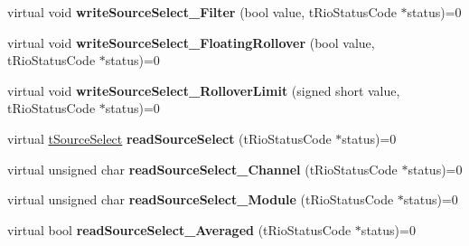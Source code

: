 \begin{DoxyCompactItemize}
\item 
\hypertarget{classnFPGA_1_1nFRC__2012__1__6__4_1_1tAnalogTrigger_a183d32683378e6e434ad2df7b1ef86e3}{
virtual void {\bfseries writeSourceSelect\_\-Filter} (bool value, tRioStatusCode $\ast$status)=0}
\label{classnFPGA_1_1nFRC__2012__1__6__4_1_1tAnalogTrigger_a183d32683378e6e434ad2df7b1ef86e3}

\item 
\hypertarget{classnFPGA_1_1nFRC__2012__1__6__4_1_1tAnalogTrigger_aaf884d77038a01ca2124cbf866f3843f}{
virtual void {\bfseries writeSourceSelect\_\-FloatingRollover} (bool value, tRioStatusCode $\ast$status)=0}
\label{classnFPGA_1_1nFRC__2012__1__6__4_1_1tAnalogTrigger_aaf884d77038a01ca2124cbf866f3843f}

\item 
\hypertarget{classnFPGA_1_1nFRC__2012__1__6__4_1_1tAnalogTrigger_aa5ac1f0ff0b1ccab9e44bfe392ce3aeb}{
virtual void {\bfseries writeSourceSelect\_\-RolloverLimit} (signed short value, tRioStatusCode $\ast$status)=0}
\label{classnFPGA_1_1nFRC__2012__1__6__4_1_1tAnalogTrigger_aa5ac1f0ff0b1ccab9e44bfe392ce3aeb}

\item 
\hypertarget{classnFPGA_1_1nFRC__2012__1__6__4_1_1tAnalogTrigger_a4989f92f70def5e6d3eda7fdbc5ac47e}{
virtual \hyperlink{unionnFPGA_1_1nFRC__2012__1__6__4_1_1tAnalogTrigger_1_1tSourceSelect}{tSourceSelect} {\bfseries readSourceSelect} (tRioStatusCode $\ast$status)=0}
\label{classnFPGA_1_1nFRC__2012__1__6__4_1_1tAnalogTrigger_a4989f92f70def5e6d3eda7fdbc5ac47e}

\item 
\hypertarget{classnFPGA_1_1nFRC__2012__1__6__4_1_1tAnalogTrigger_ae149d88f231c04cf32ae5e245637209f}{
virtual unsigned char {\bfseries readSourceSelect\_\-Channel} (tRioStatusCode $\ast$status)=0}
\label{classnFPGA_1_1nFRC__2012__1__6__4_1_1tAnalogTrigger_ae149d88f231c04cf32ae5e245637209f}

\item 
\hypertarget{classnFPGA_1_1nFRC__2012__1__6__4_1_1tAnalogTrigger_a3bd8de6cdcd78a46f9f22039baee218b}{
virtual unsigned char {\bfseries readSourceSelect\_\-Module} (tRioStatusCode $\ast$status)=0}
\label{classnFPGA_1_1nFRC__2012__1__6__4_1_1tAnalogTrigger_a3bd8de6cdcd78a46f9f22039baee218b}

\item 
\hypertarget{classnFPGA_1_1nFRC__2012__1__6__4_1_1tAnalogTrigger_acede5eb53bf74eb9989f3d03ac174094}{
virtual bool {\bfseries readSourceSelect\_\-Averaged} (tRioStatusCode $\ast$status)=0}
\label{classnFPGA_1_1nFRC__2012__1__6__4_1_1tAnalogTrigger_acede5eb53bf74eb9989f3d03ac174094}


\end{DoxyCompactItemize}
